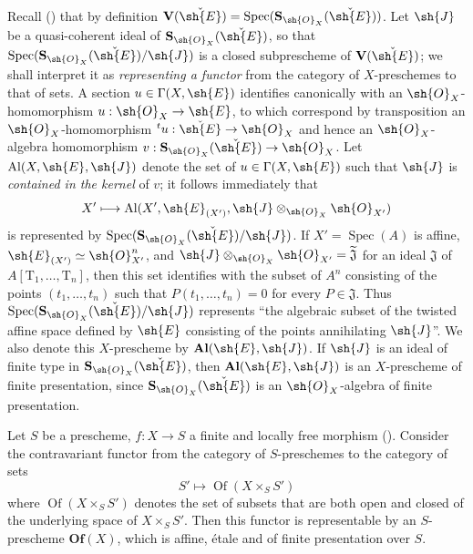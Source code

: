 \begin{env}[18.5.2]
\label{IV.18.5.2}
Recall () that by definition $\mathbf{V}(\check{\sh{E}})=\operatorname{Spec}(\mathbf{S}_{\sh{O}_X}(\check{\sh{E}}))$.
Let $\sh{J}$ be a quasi-coherent ideal of $\mathbf{S}_{\sh{O}_X}(\check{\sh{E}})$, so that $\operatorname{Spec}(\mathbf{S}_{\sh{O}_X}(\check{\sh{E}})/\sh{J})$ is a closed subprescheme of $\mathbf{V}(\check{\sh{E}})$; we shall interpret it as \emph{representing a functor} from the category of $X$-preschemes to that of sets.
A section $u\in\Gamma(X,\sh{E})$ identifies canonically with an $\sh{O}_X$-homomorphism $u:\sh{O}_X\to\sh{E}$, to which correspond by transposition an $\sh{O}_X$-homomorphism ${}^t u:\check{\sh{E}}\to\sh{O}_X$ and hence an $\sh{O}_X$-algebra homomorphism $v:\mathbf{S}_{\sh{O}_X}(\check{\sh{E}})\to\sh{O}_X$.
Let $\mathrm{Al}(X,\sh{E},\sh{J})$ denote the set of $u\in\Gamma(X,\sh{E})$ such that $\sh{J}$ is \emph{contained in the kernel} of $v$;
it follows immediately that
\[
X'\longmapsto\mathrm{Al}(X',\sh{E}_{(X')},\sh{J}\otimes_{\sh{O}_X}\sh{O}_{X'})
\]
is represented by $\operatorname{Spec}(\mathbf{S}_{\sh{O}_X}(\check{\sh{E}})/\sh{J})$.
If $X'=\operatorname{Spec}(A)$ is affine, $\sh{E}_{(X')}\simeq\sh{O}_{X'}^n$, and $\sh{J}\otimes_{\sh{O}_X}\sh{O}_{X'}=\widetilde{\mathfrak{J}}$ for an ideal $\mathfrak{J}$ of $A[\mathrm{T}_1,\ldots,\mathrm{T}_n]$, then this set identifies with the subset of $A^n$ consisting of the points $(t_1,\ldots,t_n)$ such that $P(t_1,\ldots,t_n)=0$ for every $P\in\mathfrak{J}$.
Thus $\operatorname{Spec}(\mathbf{S}_{\sh{O}_X}(\check{\sh{E}})/\sh{J})$ represents ``the algebraic subset of the twisted affine space defined by $\sh{E}$ consisting of the points annihilating $\sh{J}$''.
We also denote this $X$-prescheme by $\mathbf{Al}(\sh{E},\sh{J})$.
If $\sh{J}$ is an ideal of finite type in $\mathbf{S}_{\sh{O}_X}(\check{\sh{E}})$, then $\mathbf{Al}(\sh{E},\sh{J})$ is an $X$-prescheme of finite presentation, since $\mathbf{S}_{\sh{O}_X}(\check{\sh{E}})$ is an $\sh{O}_X$-algebra of finite presentation.
\end{env}

\begin{lemma}[18.5.3]
\label{IV.18.5.3}
Let $S$ be a prescheme, $f:X\to S$ a finite and locally free morphism ().
Consider the contravariant functor from the category of $S$-preschemes to the category of sets
\[
\label{IV.18.5.3.1}
S'\mapsto\operatorname{Of}(X\times_S S')
\tag{18.5.3.1}
\]
where $\operatorname{Of}(X\times_S S')$ denotes the set of subsets that are both open and closed of the underlying space of $X\times_S S'$.
Then this functor is representable by an $S$-prescheme $\mathbf{Of}(X)$, which is affine, \'etale and of finite presentation over $S$.
\end{lemma}

